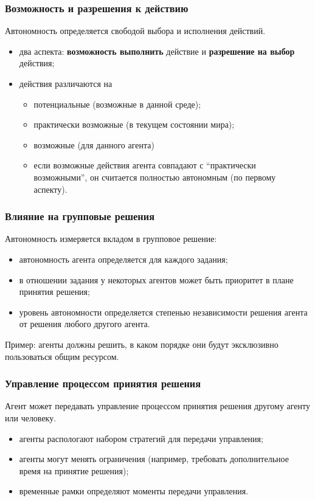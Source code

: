 \documentclass{beamer}
\begin{document}
\begin{frame}
  \frametitle{Возможность и разрешения к действию}
  Автономность определяется свободой выбора и исполнения действий.
  \begin{itemize}
    \item два аспекта: {\bf возможность выполнить} действие и {\bf разрешение на выбор} действия;
    \item действия различаются на
      \begin{itemize}
        \item потенциальные (возможные в данной среде);
        \item практически возможные (в текущем состоянии мира);
        \item возможные (для данного агента)
        \item если возможные действия агента совпадают с ``практически возможными'',
          он считается полностью автономным (по первому аспекту).
      \end{itemize}
  \end{itemize}
\end{frame}

\begin{frame}
  \frametitle{Влияние на групповые решения}
  Автономность измеряется вкладом в групповое решение:
  \begin{itemize}
    \item автономность агента определяется для каждого задания;
    \item в отношении задания у некоторых агентов может быть
      приоритет в плане принятия решения;
    \item уровень автономности определяется степенью независимости
      решения агента от решения любого другого агента.
  \end{itemize}

  Пример: агенты должны решить, в каком порядке они будут эксклюзивно
  пользоваться общим ресурсом.
\end{frame}

\begin{frame}
  \frametitle{Управление процессом принятия решения}
  Агент может передавать управление процессом принятия решения другому агенту или человеку.
  \begin{itemize}
    \item агенты распологают набором стратегий для передачи управления;
    \item агенты могут менять ограничения (например,
      требовать дополнительное время на принятие решения);
    \item временные рамки определяют моменты передачи управления.
  \end{itemize}
\end{frame}
\end{document}
